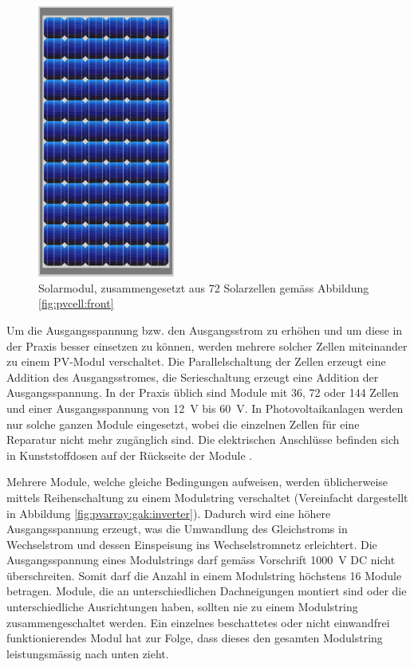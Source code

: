 \clearpage
\begin{figure}
    \centering
    \includegraphics[width=0.4\textwidth]{images/solar-facility/pvmodule.jpeg}
    \caption{
        Solarmodul,  zusammengesetzt  aus  72 Solarzellen  gem\"ass  Abbildung
        \ref{fig:pvcell:front}%
    }
    \label{fig:pvmodule}
\end{figure}


Um die  Ausgangsspannung bzw. den Ausgangsstrom  zu erh\"ohen und um  diese in
der  Praxis  besser  einsetzen  zu k\"onnen,  werden  mehrere  solcher  Zellen
miteinander zu  einem PV-Modul  verschaltet. Die Parallelschaltung  der Zellen
erzeugt  eine Addition  des Ausgangsstromes,  die Serieschaltung  erzeugt eine
Addition  der  Ausgangsspannung. In  der   Praxis  \"ublich  sind  Module  mit
36,  72  oder  144  Zellen   und  einer  Ausgangsspannung  von  \SI{12}{\volt}
bis  \SI{60}{\volt}. In Photovoltaikanlagen  werden nur  solche ganzen  Module
eingesetzt,   wobei  die   einzelnen   Zellen  f\"ur   eine  Reparatur   nicht
mehr  zug\"anglich  sind. Die  elektrischen   Anschl\"usse  befinden  sich  in
Kunststoffdosen auf der R\"uckseite der Module \cite{ref:pv:baunetz}.


Mehrere Module,  welche gleiche Bedingungen aufweisen,  werden \"ublicherweise
mittels   Reihenschaltung  zu   einem  Modulstring   verschaltet  (Vereinfacht
dargestellt   in   Abbildung   \ref{fig:pvarray:gak:inverter}). Dadurch   wird
eine   h\"ohere    Ausgangsspannung   erzeugt,   was   die    Umwandlung   des
Gleichstroms  in  Wechselstrom  und dessen  Einspeisung  ins  Wechselstromnetz
erleichtert. Die Ausgangsspannung eines  Modulstrings darf gem\"ass Vorschrift
\SI{1000}{\volt}   DC  nicht   \"uberschreiten. Somit  darf   die  Anzahl   in
einem  Modulstring  h\"ochstens  16  Module  betragen. Module,   die   an  unterschiedlichen   Dachneigungen
montiert sind  oder die unterschiedliche  Ausrichtungen haben, sollten  nie zu
einem Modulstring  zusammengeschaltet werden. Ein einzelnes  beschattetes oder
nicht  einwandfrei  funktionierendes Modul  hat  zur  Folge, dass  dieses  den
gesamten Modulstring leistungsm\"assig nach unten zieht.


